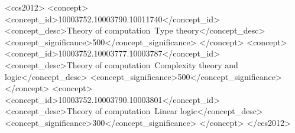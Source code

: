 

\begin{CCSXML}
<ccs2012>
   <concept>
       <concept_id>10003752.10003790.10011740</concept_id>
       <concept_desc>Theory of computation~Type theory</concept_desc>
       <concept_significance>500</concept_significance>
       </concept>
   <concept>
       <concept_id>10003752.10003777.10003787</concept_id>
       <concept_desc>Theory of computation~Complexity theory and logic</concept_desc>
       <concept_significance>500</concept_significance>
       </concept>
   <concept>
       <concept_id>10003752.10003790.10003801</concept_id>
       <concept_desc>Theory of computation~Linear logic</concept_desc>
       <concept_significance>300</concept_significance>
       </concept>
 </ccs2012>
\end{CCSXML}

